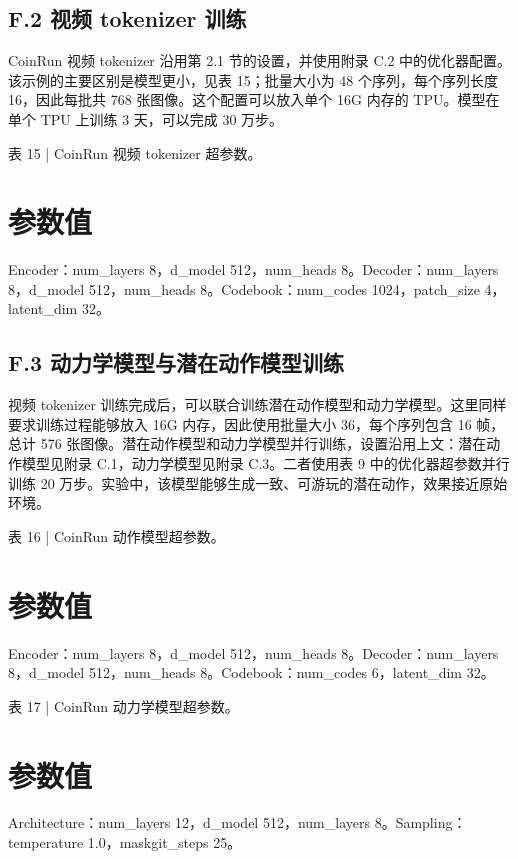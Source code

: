 \documentclass[10pt]{article}
\begin{document}
\subsection*{F.2 视频 tokenizer 训练}

CoinRun 视频 tokenizer 沿用第 2.1 节的设置，并使用附录 C.2 中的优化器配置。该示例的主要区别是模型更小，见表 15；批量大小为 48 个序列，每个序列长度 16，因此每批共 768 张图像。这个配置可以放入单个 16G 内存的 TPU。模型在单个 TPU 上训练 3 天，可以完成 30 万步。

表 15 | CoinRun 视频 tokenizer 超参数。

\section*{参数值}
Encoder：num\_layers 8，d\_model 512，num\_heads 8。Decoder：num\_layers 8，d\_model 512，num\_heads 8。Codebook：num\_codes 1024，patch\_size 4，latent\_dim 32。

\subsection*{F.3 动力学模型与潜在动作模型训练}

视频 tokenizer 训练完成后，可以联合训练潜在动作模型和动力学模型。这里同样要求训练过程能够放入 16G 内存，因此使用批量大小 36，每个序列包含 16 帧，总计 576 张图像。潜在动作模型和动力学模型并行训练，设置沿用上文：潜在动作模型见附录 C.1，动力学模型见附录 C.3。二者使用表 9 中的优化器超参数并行训练 20 万步。实验中，该模型能够生成一致、可游玩的潜在动作，效果接近原始环境。

表 16 | CoinRun 动作模型超参数。

\section*{参数值}
Encoder：num\_layers 8，d\_model 512，num\_heads 8。Decoder：num\_layers 8，d\_model 512，num\_heads 8。Codebook：num\_codes 6，latent\_dim 32。

表 17 | CoinRun 动力学模型超参数。

\section*{参数值}
Architecture：num\_layers 12，d\_model 512，num\_layers 8。Sampling：temperature 1.0，maskgit\_steps 25。
\end{document}

